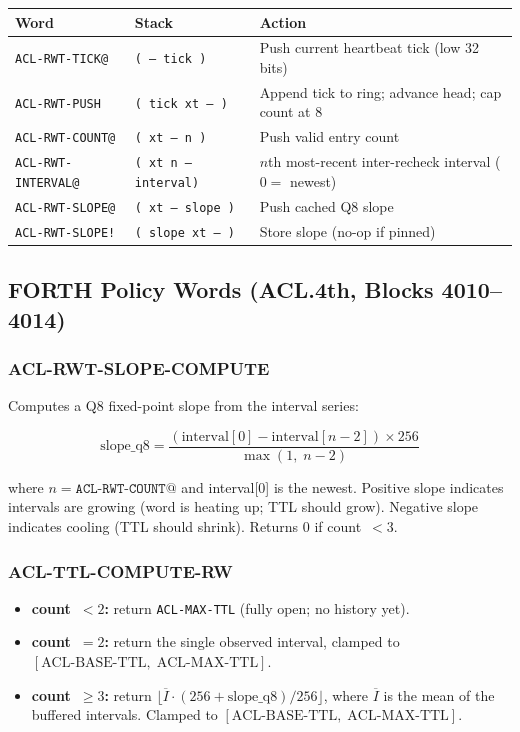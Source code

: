 \documentclass[11pt,letterpaper,openany]{article}
\newcommand{\acl}[1]{\texttt{#1}}
\begin{document}
\begin{center}
\begin{tabular}{llp{7cm}}
\toprule
\textbf{Word} & \textbf{Stack} & \textbf{Action} \\
\midrule
\acl{ACL-RWT-TICK@}     & \texttt{( -- tick )}        & Push current heartbeat tick (low 32 bits) \\
\acl{ACL-RWT-PUSH}      & \texttt{( tick xt -- )}     & Append tick to ring; advance head; cap count at 8 \\
\acl{ACL-RWT-COUNT@}    & \texttt{( xt -- n )}        & Push valid entry count \\
\acl{ACL-RWT-INTERVAL@} & \texttt{( xt n -- interval)}& $n$th most-recent inter-recheck interval ($0=$ newest) \\
\acl{ACL-RWT-SLOPE@}    & \texttt{( xt -- slope )}    & Push cached Q8 slope \\
\acl{ACL-RWT-SLOPE!}    & \texttt{( slope xt -- )}    & Store slope (no-op if pinned) \\
\bottomrule
\end{tabular}
\end{center}

\subsection{FORTH Policy Words (ACL.4th, Blocks 4010--4014)}

\subsubsection*{ACL-RWT-SLOPE-COMPUTE}

Computes a Q8 fixed-point slope from the interval series:

\[
  \text{slope\_q8} =
  \frac{(\text{interval}[0] - \text{interval}[n-2]) \times 256}
       {\max(1,\; n - 2)}
\]

where $n = \texttt{ACL-RWT-COUNT@}$ and interval[0] is the newest.
Positive slope indicates intervals are growing (word is heating up;
TTL should grow).  Negative slope indicates cooling (TTL should
shrink).  Returns 0 if count~$<3$.

\subsubsection*{ACL-TTL-COMPUTE-RW}

\begin{itemize}
  \item \textbf{count~$<2$:} return \texttt{ACL-MAX-TTL} (fully open; no history yet).
  \item \textbf{count~$= 2$:} return the single observed interval, clamped to
    $[\text{ACL-BASE-TTL},\; \text{ACL-MAX-TTL}]$.
  \item \textbf{count~$\geq 3$:} return
    $\bigl\lfloor \overline{I} \cdot (256 + \text{slope\_q8}) / 256 \bigr\rfloor$,
    where $\overline{I}$ is the mean of the buffered intervals.
    Clamped to $[\text{ACL-BASE-TTL},\; \text{ACL-MAX-TTL}]$.
\end{itemize}
\end{document}
